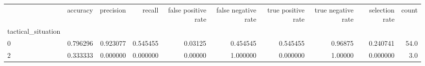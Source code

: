\begin{tabular}{lrrrrrrrrr}
\toprule
{} &  accuracy &  precision &    recall &  false positive rate &  false negative rate &  true positive rate &  true negative rate &  selection rate &  count \\
tactical\_situation &           &            &           &                      &                      &                     &                     &                 &        \\
\midrule
0                  &  0.796296 &   0.923077 &  0.545455 &              0.03125 &             0.454545 &            0.545455 &             0.96875 &        0.240741 &   54.0 \\
2                  &  0.333333 &   0.000000 &  0.000000 &              0.00000 &             1.000000 &            0.000000 &             1.00000 &        0.000000 &    3.0 \\
\bottomrule
\end{tabular}
